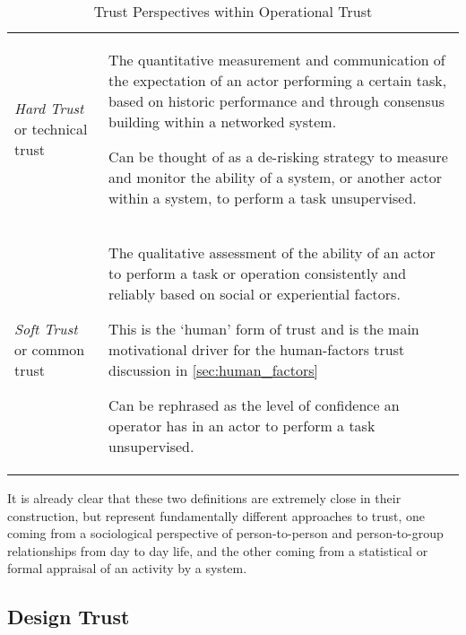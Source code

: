 \begin{table}
  \caption{Trust Perspectives within Operational Trust}
  \label{tab:operational_trust_perspectives}
  \begin{tabularx}{\textwidth}{p{3cm}X}\toprule
    \emph{Hard Trust} or technical trust & The quantitative measurement and communication of the expectation of an actor performing a certain task, based on historic performance and through consensus building within a networked system.\par
    Can be thought of as a de-risking strategy to measure and monitor the ability of a system, or another actor within a system, to perform a task unsupervised.\\
    \emph{Soft Trust} or common trust & The qualitative assessment of the ability of an actor to perform a task or operation consistently and reliably based on social or experiential factors.\par
    This is the ‘human’ form of trust and is the main motivational driver for the human-factors trust discussion in \autoref{sec:human_factors}\par
    Can be rephrased as the level of confidence an operator has in an actor to perform a task unsupervised.\\
    \bottomrule
  \end{tabularx}
\end{table}

It is already clear that these two definitions are extremely close in their construction, but represent fundamentally different approaches to trust, one coming from a sociological perspective of person-to-person and person-to-group relationships from day to day life, and the other coming from a statistical or formal appraisal of an activity by a system.

\subsection{Design Trust}

